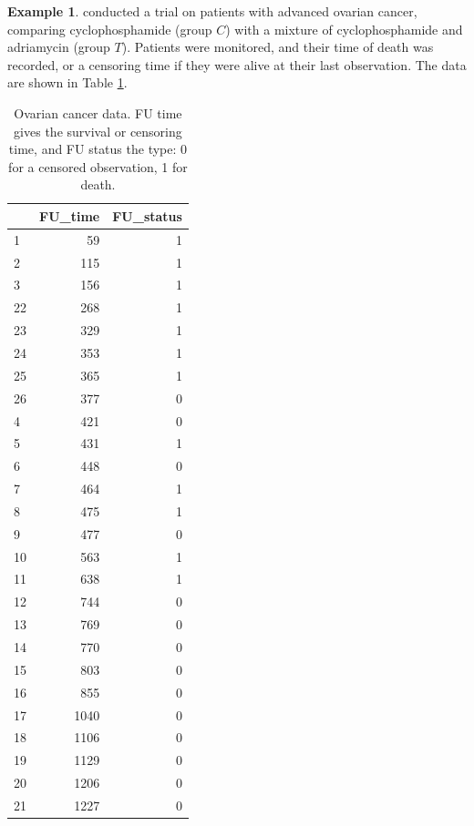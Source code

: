 \documentclass[
  openany]{book}
\theoremstyle{definition}
\theoremstyle{definition}
\newtheorem{example}{Example}[chapter]
\theoremstyle{definition}
\theoremstyle{definition}
\theoremstyle{remark}
\begin{document}
\begin{example}
\protect\hypertarget{exm:surveg1}{}\label{exm:surveg1}\citet{edmonson1979prognosis} conducted a trial on patients with advanced ovarian cancer, comparing cyclophosphamide (group \(C\)) with a mixture of cyclophosphamide and adriamycin (group \(T\)). Patients were monitored, and their time of death was recorded, or a censoring time if they were alive at their last observation. The data are shown in Table \ref{tab:ovdata}.

\begin{table}
\centering
\caption{\label{tab:ovdata}Ovarian cancer data. FU time gives the survival or censoring time, and FU status the type: 0 for a censored observation, 1 for death. }
\centering
\begin{tabular}[t]{l|r|r}
\hline
  & FU\_time & FU\_status\\
\hline
1 & 59 & 1\\
\hline
2 & 115 & 1\\
\hline
3 & 156 & 1\\
\hline
22 & 268 & 1\\
\hline
23 & 329 & 1\\
\hline
24 & 353 & 1\\
\hline
25 & 365 & 1\\
\hline
26 & 377 & 0\\
\hline
4 & 421 & 0\\
\hline
5 & 431 & 1\\
\hline
6 & 448 & 0\\
\hline
7 & 464 & 1\\
\hline
8 & 475 & 1\\
\hline
9 & 477 & 0\\
\hline
10 & 563 & 1\\
\hline
11 & 638 & 1\\
\hline
12 & 744 & 0\\
\hline
13 & 769 & 0\\
\hline
14 & 770 & 0\\
\hline
15 & 803 & 0\\
\hline
16 & 855 & 0\\
\hline
17 & 1040 & 0\\
\hline
18 & 1106 & 0\\
\hline
19 & 1129 & 0\\
\hline
20 & 1206 & 0\\
\hline
21 & 1227 & 0\\
\hline
\end{tabular}
\end{table}


\end{example}
\end{document}
